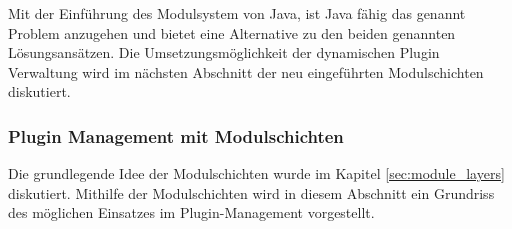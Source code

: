 			Mit der Einführung des Modulsystem von Java, ist Java fähig das genannt Problem anzugehen und bietet eine Alternative zu den beiden genannten Lösungsansätzen. Die Umsetzungsmöglichkeit der dynamischen Plugin Verwaltung wird im nächsten Abschnitt der neu eingeführten Modulschichten diskutiert. 

		\subsubsection{Plugin Management mit Modulschichten}\label{ssub:plugin_managment_mit_modulschichten}
			Die grundlegende Idee der Modulschichten wurde im Kapitel \ref{sec:module_layers} diskutiert. Mithilfe der Modulschichten wird in diesem Abschnitt ein Grundriss des möglichen Einsatzes im Plugin-Management vorgestellt.\bigbreak

